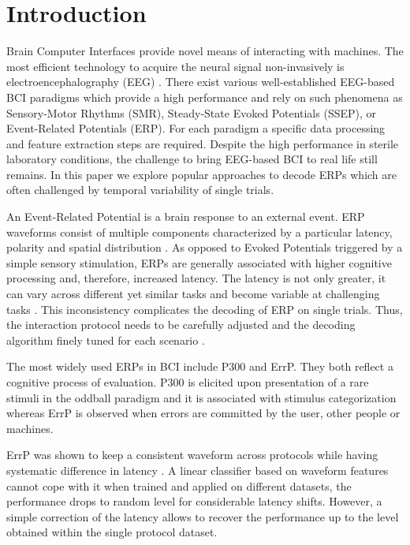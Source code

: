 \documentclass[12pt]{iopart}
\begin{document}
\section{Introduction}
\label{sec:intro}

Brain Computer Interfaces provide novel means of interacting
with machines. The most efficient technology to acquire
the neural signal non-invasively is electroencephalography (EEG) \cite{luck_introduction_2005}.
There exist various well-established EEG-based BCI paradigms which
provide a high performance and rely on such phenomena as
Sensory-Motor Rhythms (SMR), Steady-State Evoked Potentials (SSEP),
or Event-Related Potentials (ERP).
For each paradigm a specific data processing and feature
extraction steps are required.
Despite the high performance in sterile laboratory
conditions, the challenge to bring EEG-based BCI to real life
still remains. In this paper we explore popular approaches to decode ERPs
which are often challenged by temporal variability of single trials.

An Event-Related Potential is a brain response to an external event.
ERP waveforms consist of multiple components characterized
by a particular latency, polarity and spatial distribution \cite{duncan_event-related_2009}.
As opposed to Evoked Potentials triggered by a simple sensory stimulation,
ERPs are generally associated with higher cognitive processing
and, therefore, increased latency. The latency is not only greater, it can
vary across different yet similar tasks and become variable
at challenging tasks \cite{arico_evaluation_2013}. This inconsistency complicates the decoding of
ERP on single trials. Thus, the interaction
protocol needs to be carefully adjusted and the decoding
algorithm finely tuned for each scenario \cite{iturrate_task-dependent_2013}.

The most widely used ERPs in BCI include P300 and ErrP.
They both reflect a cognitive process of evaluation.
P300 is elicited upon presentation of a rare stimuli in the oddball paradigm
and it is associated with stimulus categorization whereas
ErrP is observed when errors are committed by the user, other people or machines.

ErrP was shown to keep a consistent waveform across protocols
while having systematic difference in latency \cite{iturrate_latency_2014-1}.
A linear classifier
based on waveform features cannot cope with it when trained and applied
on different datasets, the performance drops to random level
for considerable latency shifts. However, a simple correction of 
the latency allows to recover the performance up to the level
obtained within the single protocol dataset.
\end{document}
